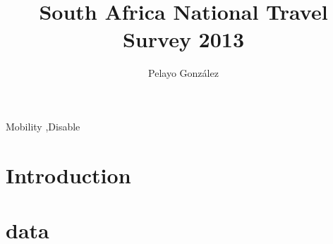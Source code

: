 \documentclass[preprint,review,authoryear, 3p,times]{elsarticle}\usepackage[]{graphicx}\usepackage[]{color}
\begin{document}

\begin{frontmatter}

\title{South Africa National Travel Survey 2013}
\author[ovd]{Pelayo Gonz\'{a}lez }
\address[ovd]{Facultad de Econom\'{i}a y Empresa, Avda del Cristo s/n. 33006 Oviedo - Spain}

\begin{abstract}

\end{abstract}

\begin{keyword}
Mobility \sep Disable 
\end{keyword}

\end{frontmatter}





\section{Introduction}

\citep{Mercado2010}


\section{data}
\end{document}
